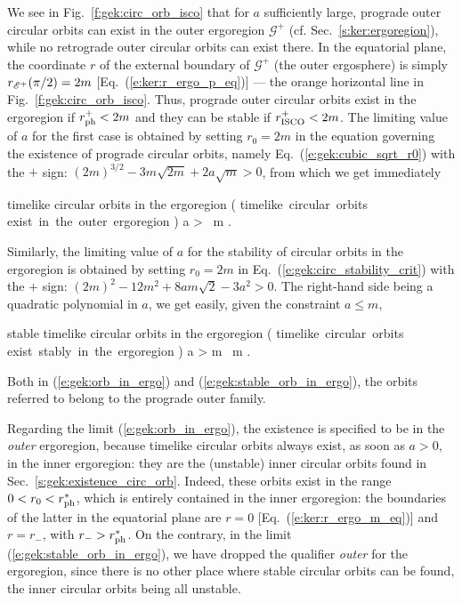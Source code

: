 We see in Fig.~\ref{f:gek:circ_orb_isco} that for $a$ sufficiently large,
prograde outer circular orbits can exist in the outer ergoregion $\mathscr{G}^+$
(cf. Sec.~\ref{s:ker:ergoregion}), while no retrograde outer circular orbits
can exist there.
In the equatorial plane, the coordinate $r$
of the external boundary of $\mathscr{G}^+$
(the outer ergosphere) is
simply $r_{\mathscr{E}^+}(\pi/2) = 2 m$ [Eq.~(\ref{e:ker:r_ergo_p_eq})] --- the orange
horizontal line in Fig.~\ref{f:gek:circ_orb_isco}.
Thus, prograde outer circular orbits exist in the ergoregion if
$r_{\rm ph}^+ < 2 m$ and they can be stable if $r_{\rm ISCO}^+ < 2 m$.
The limiting value of $a$ for the first case is obtained by setting
$r_0 = 2 m$ in the equation governing the existence of prograde circular orbits,
namely Eq.~(\ref{e:gek:cubic_sqrt_r0}) with the $+$ sign:
$(2m)^{3/2} - 3 m \sqrt{2m} + 2 a \sqrt{m} > 0$,
from which we get immediately
\begin{tprop}{timelike circular orbits in the ergoregion}{}
\be \label{e:gek:orb_in_ergo}
    \left( {\mbox{timelike circular orbits}\atop
     \mbox{exist in the outer ergoregion}} \right)
     \iff a >  \, m .
\ee
\end{tprop}
Similarly, the limiting value of $a$ for the stability of
circular orbits in the ergoregion is obtained by setting $r_0 = 2m$ in
Eq.~(\ref{e:gek:circ_stability_crit}) with the $+$ sign:
$(2 m)^2 - 12 m^2 + 8 a m\sqrt{2} - 3 a^2 > 0$.
The right-hand side being a quadratic polynomial in $a$, we get
easily, given the constraint $a \leq m$,
\begin{tprop}{stable timelike circular orbits in the ergoregion}{}
\be \label{e:gek:stable_orb_in_ergo}
    \left( {\mbox{timelike circular orbits}\atop
     \mbox{exist stably in the ergoregion}} \right)
     \iff a >  m \, m .
\ee
\end{tprop}
Both in (\ref{e:gek:orb_in_ergo}) and (\ref{e:gek:stable_orb_in_ergo}), the
orbits referred to belong to the prograde outer family.

\begin{remark}
Regarding the limit (\ref{e:gek:orb_in_ergo}), the existence is specified to
be in the \emph{outer} ergoregion, because timelike circular orbits always
exist, as soon as $a>0$, in the inner ergoregion: they are the (unstable) inner circular
orbits found in Sec.~\ref{s:gek:existence_circ_orb}. Indeed, these orbits exist
in the range $0 < r_0 < r_{\rm ph}^*$, which is entirely contained in the
inner ergoregion: the boundaries of the latter in the equatorial plane are
$r=0$ [Eq.~(\ref{e:ker:r_ergo_m_eq})] and $r=r_-$, with $r_- > r_{\rm ph}^*$.
On the contrary, in the limit (\ref{e:gek:stable_orb_in_ergo}), we have
dropped the qualifier \emph{outer} for the ergoregion, since there is no other
place where stable circular orbits can be found, the inner circular orbits
being all unstable.
\end{remark}

